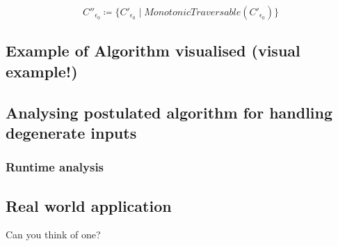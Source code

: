 $$ C''_{\epsilon_0} \coloneqq \{ C'_{\epsilon_0} \mid MonotonicTraversable(C'_{\epsilon_0}) \} $$



\subsection{Example of Algorithm visualised (visual example!)}

\subsection{Analysing postulated algorithm for handling degenerate inputs}
\subsubsection{Runtime analysis}
\subsection{Real world application}
	Can you think of one?
	
	
	